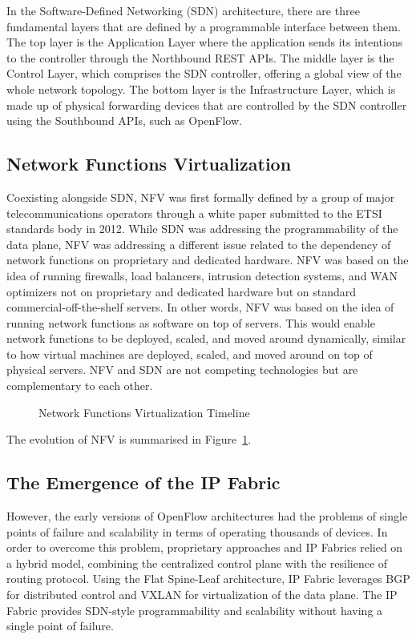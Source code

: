 In the Software-Defined Networking (SDN) architecture, there are three fundamental layers that are defined by a programmable interface between them. The top layer is the Application Layer where the application sends its intentions to the controller through the Northbound REST APIs. The middle layer is the Control Layer, which comprises the SDN controller, offering a global view of the whole network topology. The bottom layer is the Infrastructure Layer, which is made up of physical forwarding devices that are controlled by the SDN controller using the Southbound APIs, such as OpenFlow.

\subsection*{Network Functions Virtualization}
Coexisting alongside SDN, NFV was first formally defined by a group of major telecommunications operators through a white paper submitted to the ETSI standards body in 2012\cite{SDN_Architecture}. While SDN was addressing the programmability of the data plane, NFV was addressing a different issue related to the dependency of network functions on proprietary and dedicated hardware.
NFV was based on the idea of running firewalls, load balancers, intrusion detection systems, and WAN optimizers not on proprietary and dedicated hardware but on standard commercial-off-the-shelf servers. In other words, NFV was based on the idea of running network functions as software on top of servers. This would enable network functions to be deployed, scaled, and moved around dynamically, similar to how virtual machines are deployed, scaled, and moved around on top of physical servers. NFV and SDN are not competing technologies but are complementary to each other.

\begin{figure}[!htbp]
    \centering
    \NFVtimeline
    \caption{Network Functions Virtualization Timeline}
    \label{fig:nfv-timeline}
\end{figure}
The evolution of NFV is summarised in Figure~\ref{fig:nfv-timeline}.

\subsection{The Emergence of the IP Fabric}
However, the early versions of OpenFlow architectures had the problems of single points of failure and scalability in terms of operating thousands of devices. In order to overcome this problem, proprietary approaches and IP Fabrics relied on a hybrid model, combining the centralized control plane with the resilience of routing protocol. Using the Flat Spine-Leaf architecture, IP Fabric leverages BGP for distributed control and VXLAN for virtualization of the data plane. The IP Fabric provides SDN-style programmability and scalability without having a single point of failure.

